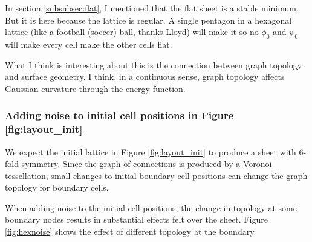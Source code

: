 In section \ref{subsubsec:flat}, I mentioned that the flat sheet is a stable minimum. But it is here because the lattice is regular. A single pentagon in a hexagonal lattice (like a football (soccer) ball, thanks Lloyd) will make it so no $\phi_0$ and $\psi_0$ will make every cell make the other cells flat. 

What I think is interesting about this is the connection between graph topology and surface geometry. I think, in a continuous sense, graph topology affects Gaussian curvature through the energy function. 

\subsubsection{Adding noise to initial cell positions in Figure \ref{fig:layout_init}}

We expect the initial lattice in Figure \ref{fig:layout_init} to produce a sheet with 6-fold symmetry. Since the graph of connections is produced by a Voronoi tessellation, small changes to initial boundary cell positions can change the graph topology for boundary cells. 

When adding noise to the initial cell positions, the change in topology at some boundary nodes results in substantial effects felt over the sheet. Figure \ref{fig:hexnoise} shows the effect of different topology at the boundary.

